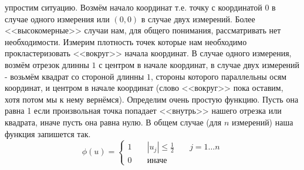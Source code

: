 \documentclass[11pt]{article}
\begin{document}
упростим ситуацию. Возмём начало координат т.е. точку с координатой $0$
в случае одного измерения или $(0, 0)$ в случае двух измерений. Более
<<высокомерные>> случаи нам, для общего понимания, рассматривать
нет необходимости. Измерим плотность точек которые нам необходимо
прокластеризовать <<вокруг>> начала координат. В случае одного
измерения, возмём отрезок длинны $1$ с центром в начале координат, в
случае двух измерений - возьмём квадрат со стороной длинны $1$, стороны
которого параллельны осям координат, и центром в начале координат (слово
<<вокруг>> пока оставим, хотя потом мы к нему вернёмся). Определим
очень простую функцию. Пусть она равна 1 если произвольная точка
попадает <<внутрь>> нашего отрезка или квадрата, иначе пусть она
равна нулю. В общем случае (для $n$ измерений) наша функция запишется
так. \[
\phi(u) = \left\lbrace
            \begin{aligned}
            1 && \; |u_j| \le \frac{1}{2} && \; j = 1\ldots n \\
            0 && \; \mbox{иначе} &&
           \end{aligned}
          \right.
\]
\end{document}
